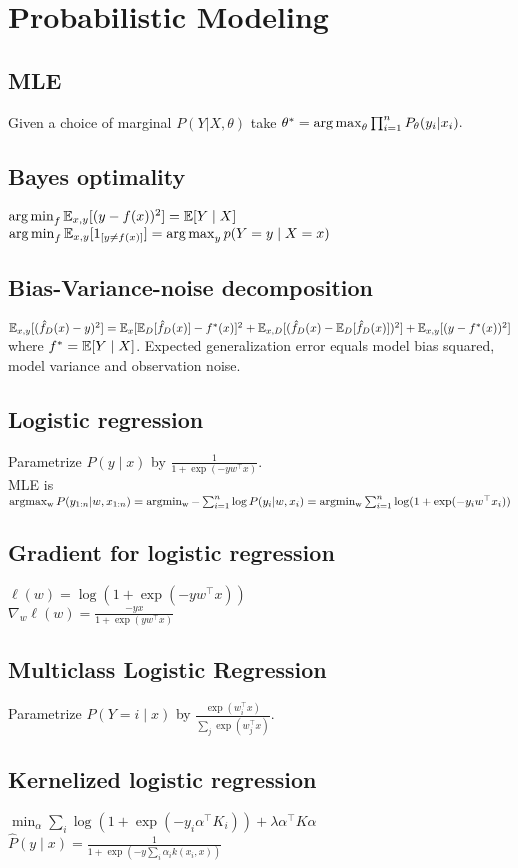 \section*{Probabilistic Modeling}
\subsection*{MLE}
Given a choice of marginal $P(Y|X,\theta)$ take 
$\theta^* =\operatorname*{arg\,max}_\theta \prod_{i=1}^n {P_\theta}(y_i|x_i).$

\subsection*{Bayes optimality}
$\operatorname*{arg\,min}_f\mathbb{E}_{x,y}[(y-f(x))^2]=\mathbb{E}[Y\mid X]$\\
$\operatorname*{arg\,min}_f\mathbb{E}_{x,y}[1_{[y\neq f(x)]}]\\=\operatorname*{arg\,max}_yp(Y=y\mid X=x)$

\subsection*{Bias-Variance-noise decomposition}
$\mathbb{E}_{x,y}[(\hat{f}_D(x)- y)^2]= \mathbb{E}_x[\mathbb{E}_D[\hat{f}_D(x)]-f^*(x)]^2\\
\hspace*{0.1mm}+\mathbb{E}_{x,D}[(\hat{f}_D(x) - \mathbb{E}_D[\hat{f}_D(x)])^2] +\mathbb{E}_{x,y}[(y-f^*(x))^2]$ where $f^*=\mathbb{E}[Y\mid X]$. Expected generalization error equals model bias squared, model variance and observation noise.


\subsection*{Logistic regression}
Parametrize $P(y\mid x)$ by $\frac{1}{1+\exp(-y w^\top x)}$.\\
MLE is $\operatorname{argmax_w} P(y_{1:n}|w,x_{1:n})\\
= \operatorname{argmin_w} - \sum_{i=1}^n \log P(y_i|w,x_i)\\
= \operatorname{argmin_w} \sum_{i=1}^n \log(1+\exp(-y_i w^\top x_i))$

\subsection*{Gradient for logistic regression}
$\ell(w) = \log(1+\exp(-yw^\top x))$\\
$\nabla_w \ell(w) =\frac{-yx}{1+\exp(yw^\top x)}$

\subsection*{Multiclass Logistic Regression}
Parametrize $P(Y=i\mid x)$ by $\frac{\exp(w_i^\top x)}{\sum_j \exp(w_j^\top x)}$.

\subsection*{Kernelized logistic regression}
$\min_\alpha\sum_i\log(1+\exp(-y_i\alpha^\top K_i)) + \lambda\alpha^\top K \alpha$
$\hat{P}(y\mid x)=\frac{1}{1+\exp(-y\sum_i\alpha_ik(x_i,x))}$
\\